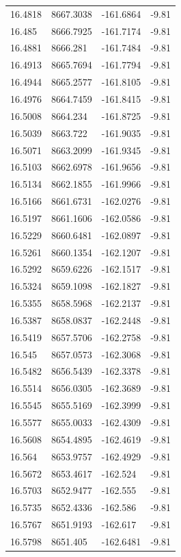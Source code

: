 \begin{table}[H]
\begin{tabular}{llll}
16.4818 & 8667.3038 & -161.6864 & -9.81 \\
16.485 & 8666.7925 & -161.7174 & -9.81 \\
16.4881 & 8666.281 & -161.7484 & -9.81 \\
16.4913 & 8665.7694 & -161.7794 & -9.81 \\
16.4944 & 8665.2577 & -161.8105 & -9.81 \\
16.4976 & 8664.7459 & -161.8415 & -9.81 \\
16.5008 & 8664.234 & -161.8725 & -9.81 \\
16.5039 & 8663.722 & -161.9035 & -9.81 \\
16.5071 & 8663.2099 & -161.9345 & -9.81 \\
16.5103 & 8662.6978 & -161.9656 & -9.81 \\
16.5134 & 8662.1855 & -161.9966 & -9.81 \\
16.5166 & 8661.6731 & -162.0276 & -9.81 \\
16.5197 & 8661.1606 & -162.0586 & -9.81 \\
16.5229 & 8660.6481 & -162.0897 & -9.81 \\
16.5261 & 8660.1354 & -162.1207 & -9.81 \\
16.5292 & 8659.6226 & -162.1517 & -9.81 \\
16.5324 & 8659.1098 & -162.1827 & -9.81 \\
16.5355 & 8658.5968 & -162.2137 & -9.81 \\
16.5387 & 8658.0837 & -162.2448 & -9.81 \\
16.5419 & 8657.5706 & -162.2758 & -9.81 \\
16.545 & 8657.0573 & -162.3068 & -9.81 \\
16.5482 & 8656.5439 & -162.3378 & -9.81 \\
16.5514 & 8656.0305 & -162.3689 & -9.81 \\
16.5545 & 8655.5169 & -162.3999 & -9.81 \\
16.5577 & 8655.0033 & -162.4309 & -9.81 \\
16.5608 & 8654.4895 & -162.4619 & -9.81 \\
16.564 & 8653.9757 & -162.4929 & -9.81 \\
16.5672 & 8653.4617 & -162.524 & -9.81 \\
16.5703 & 8652.9477 & -162.555 & -9.81 \\
16.5735 & 8652.4336 & -162.586 & -9.81 \\
16.5767 & 8651.9193 & -162.617 & -9.81 \\
16.5798 & 8651.405 & -162.6481 & -9.81 \\

\end{tabular}
\end{table}
